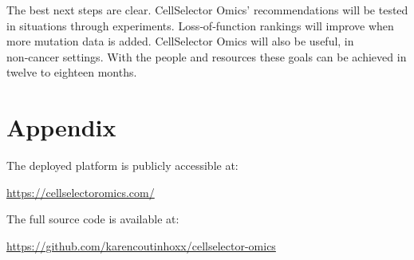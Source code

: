 \documentclass[author={Karen Coutinho, Ishaan Bhalla, Aman Raj, Dixit Kaloorani Malarmannan},
                supervisor={Dr. Daniel D'Andrea},
                degree={MSc},
                title={CellSelector Omics: A Multi-Omics Recommendation System for Cell Line Selection},
                subtitle={},
                type={},
                year={2026}]{dissertation}
\begin{document}
The best next steps are clear. CellSelector Omics’ recommendations will be tested in situations through experiments. Loss‑of‑function rankings will improve when more mutation data is added. CellSelector Omics will also be useful, in non‑cancer settings. With the people and resources these goals can be achieved in twelve to eighteen months.


\backmatter



\chapter*{Appendix}

The deployed platform is publicly accessible at:
\begin{center}
    \url{https://cellselectoromics.com/}
\end{center}

\vspace{-0.2cm}
The full source code is available at:
\begin{center}
    \url{https://github.com/karencoutinhoxx/cellselector-omics}
\end{center}

\vspace{0.3cm}



\end{document}
